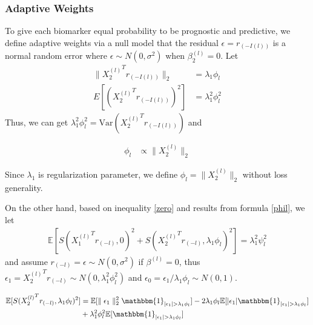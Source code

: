\documentclass[12pt]{article}
\begin{document}
\subsubsection*{Adaptive Weights}

To give each biomarker equal probability to be prognostic and predictive,
we define adaptive weights via a null model that the residual $\epsilon=r_{(-I(l))}$ 
is a normal random error where $\epsilon\sim N(0,\sigma^2)$ when $\beta_2^{(l)}=0$.
Let
\begin{equation} \label{phil}
  \begin{split}
  \parallel {X_2^{(l)}}^T r_{(-I(l))} \parallel_2 & = \lambda_1\phi_l \\
  E[( {X_2^{(l)}}^T r_{(-I(l))})^2] & = \lambda_1^2\phi_l^2
\end{split}
\end{equation}
Thus, we can get $\lambda_1^2\phi_l^2 = \text{Var}( {X_2^{(l)}}^T r_{(-I(l))})$ and 

\begin{align}
  \phi_l & \propto \parallel X_2^{(l)} \parallel_2 
\end{align}

Since $\lambda_1$ is regularization parameter, we define $\phi_l=\parallel X_2^{(l)} \parallel_2$
without loss generality.

On the other hand, based on inequality \ref{zero} and results from formula \ref{phil}, we let
\begin{align}
  \mathbb{E} [ S( {X_1^{(l)}}^T r_{(-l)},0)^2+S( {X_2^{(l)}}^T r_{(-l)},\lambda_1\phi_l)^2  ] = \lambda_1^2\psi_l^2
\end{align}
and assume $ r_{(-l)} = \epsilon  \sim N(0,\sigma^2)$ if $\beta^{(l)}=0$, thus $\epsilon_1= {X_2^{(l)}}^T r_{(-l)} \sim N(0,\lambda_1^2\phi_l^2)$ and 
$\epsilon_0=\epsilon_1/\lambda_1\phi_l\sim N(0,1)$.



\begin{equation} \label{equ_1}
  \begin{split}
 \mathbb{E}[S( {X_2^{(l)}}^T r_{(-l)},\lambda_1\phi_l)^2] &  =  \mathbb{E}[\parallel \epsilon_1 \parallel_2^2 \mathbbm{1}_{|\epsilon_1|>\lambda_1\phi_l}]-2\lambda_1\phi_l\mathbb{E}[|\epsilon_1|\mathbbm{1}_{|\epsilon_1|>\lambda_1\phi_l}]  \\
  &  + \lambda_1^2\phi_l^2\mathbb{E}[\mathbbm{1}_{|\epsilon_1|>\lambda_1\phi_l}] \\
\end{split}
\end{equation}
  
\end{document}

